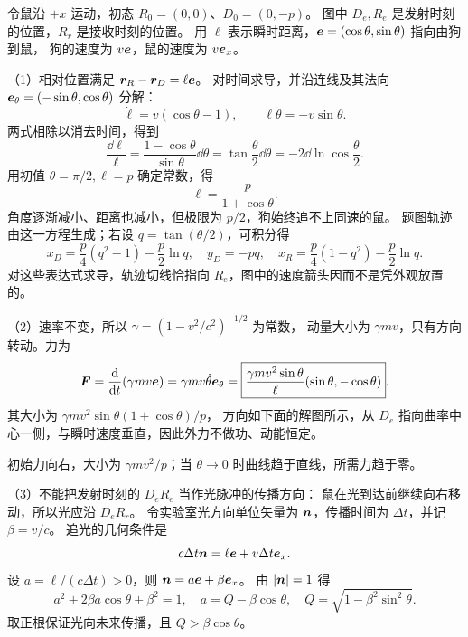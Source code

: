 \begin{advsolution}
令鼠沿 $+x$ 运动，初态 $R_0=(0,0)$、$D_0=(0,-p)$。
图中 $D_e,R_e$ 是发射时刻的位置，$R_r$ 是接收时刻的位置。
用 $\ell$ 表示瞬时距离，$\bm{e}=(\cos\theta,\sin\theta)$ 指向由狗到鼠，
狗的速度为 $v\bm{e}$，鼠的速度为 $v\bm{e}_x$。

（1）相对位置满足 $\bm{r}_R-\bm{r}_D=\ell\bm{e}$。
对时间求导，并沿连线及其法向 $\bm{e}_\theta=(-\sin\theta,\cos\theta)$ 分解：
\[
 \dot\ell=v(\cos\theta-1),\qquad
 \ell\dot\theta=-v\sin\theta.
\]
两式相除以消去时间，得到
\[
 \frac{\dd\ell}{\ell}=\frac{1-\cos\theta}{\sin\theta}\dd\theta
 =\tan\frac\theta2\dd\theta=-2\dd\ln\cos\frac\theta2.
\]
用初值 $\theta=\pi/2,\ell=p$ 确定常数，得
\[
 \boxed{\ell=\frac{p}{1+\cos\theta}}.
\]
角度逐渐减小、距离也减小，但极限为 $p/2$，狗始终追不上同速的鼠。
题图轨迹由这一方程生成；若设 $q=\tan(\theta/2)$，可积分得
\[
 x_D=\frac p4(q^2-1)-\frac p2\ln q,\quad y_D=-pq,
 \quad x_R=\frac p4(1-q^2)-\frac p2\ln q.
\]
对这些表达式求导，轨迹切线恰指向 $R_e$，图中的速度箭头因而不是凭外观放置的。

（2）速率不变，所以 $\gamma=(1-v^2/c^2)^{-1/2}$ 为常数，
动量大小为 $\gamma mv$，只有方向转动。力为
\[
 \bm{F}=\frac{\mathop{}\!\mathrm d}{\mathop{}\!\mathrm d t}(\gamma mv\bm{e})
 =\gamma mv\dot\theta\bm{e}_\theta
 =\boxed{\frac{\gamma mv^2\sin\theta}{\ell}(\sin\theta,-\cos\theta)}.
\]
其大小为 $\gamma mv^2\sin\theta(1+\cos\theta)/p$，
方向如下面的解图所示，从 $D_e$ 指向曲率中心一侧，与瞬时速度垂直，因此外力不做功、动能恒定。
\begin{center}\begin{minipage}{\linewidth}\centering
\label{advA6:quality:A6-source-exercises:a7}\label{advA6:fig:pursuit-force-solution}
\end{minipage}\end{center}

初始力向右，大小为 $\gamma mv^2/p$；当 $\theta\to0$ 时曲线趋于直线，所需力趋于零。

（3）不能把发射时刻的 $D_eR_e$ 当作光脉冲的传播方向：
鼠在光到达前继续向右移动，所以光应沿 $D_eR_r$。
令实验室光方向单位矢量为 $\bm{n}$，传播时间为 $\Delta t$，并记 $\beta=v/c$。
追光的几何条件是
\[
 c\Delta t\bm{n}=\ell\bm{e}+v\Delta t\bm{e}_x.
\]
设 $a=\ell/(c\Delta t)>0$，则 $\bm{n}=a\bm{e}+\beta\bm{e}_x$。
由 $|\bm{n}|=1$ 得
\[
 a^2+2\beta a\cos\theta+\beta^2=1,
 \quad a=Q-\beta\cos\theta,\quad
 Q=\sqrt{1-\beta^2\sin^2\theta}.
\]
取正根保证光向未来传播，且 $Q>\beta\cos\theta$。


\end{advsolution}
